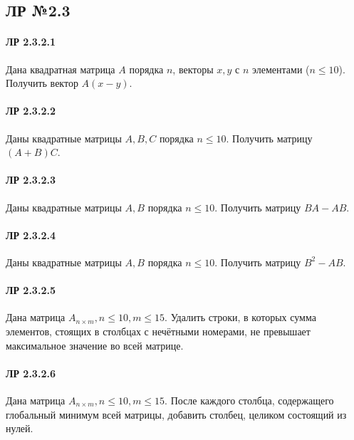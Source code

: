 \documentclass[12pt,a4paper]{report}
\begin{document}
\subsection*{ЛР №2.3}
\paragraph*{ЛР 2.3.2.1} Дана квадратная матрица $A$ порядка $n$, векторы $x, y$ с $n$ элементами ($n \le 10$). Получить вектор $A(x-y)$.
\paragraph*{ЛР 2.3.2.2} Даны квадратные матрицы $A, B, C$ порядка $n \le 10$. Получить матрицу $(A+B)C$.
\paragraph*{ЛР 2.3.2.3} Даны квадратные матрицы $A, B$ порядка $n \le 10$. Получить матрицу $BA-AB$.
\paragraph*{ЛР 2.3.2.4} Даны квадратные матрицы $A, B$ порядка $n \le 10$. Получить матрицу $B^2-AB$.
\paragraph*{ЛР 2.3.2.5} Дана матрица $A_{n \times m}, n \le 10, m \le 15$. Удалить строки, в которых сумма элементов, стоящих в столбцах с нечётными номерами, не превышает максимальное значение во всей матрице.
\paragraph*{ЛР 2.3.2.6} Дана матрица $A_{n \times m}, n \le 10, m \le 15$. После каждого столбца, содержащего глобальный минимум всей матрицы, добавить столбец, целиком состоящий из нулей.
\end{document}
